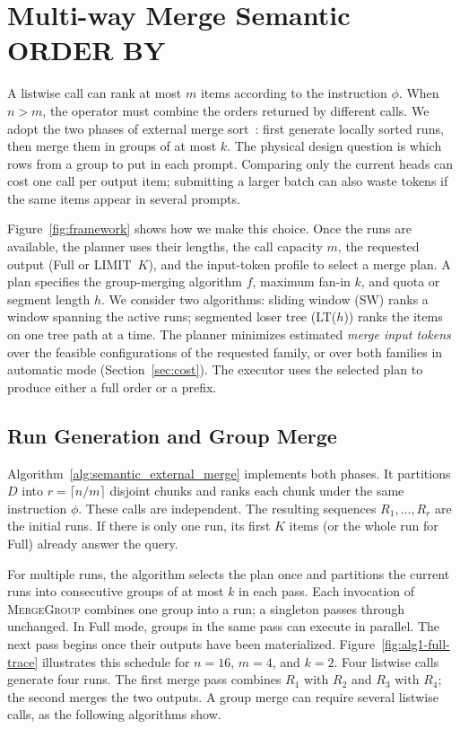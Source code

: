 \section{Multi-way Merge Semantic \textsf{ORDER BY}}
\label{sec:framework}

A listwise call can rank at most $m$ items according to the instruction $\phi$. When $n>m$, the operator must combine the orders returned by different calls. We adopt the two phases of external merge sort~\cite{DBLP:journals/csur/Graefe06}: first generate locally sorted runs, then merge them in groups of at most $k$. The physical design question is which rows from a group to put in each prompt. Comparing only the current heads can cost one call per output item; submitting a larger batch can also waste tokens if the same items appear in several prompts.

Figure~\ref{fig:framework} shows how we make this choice. Once the runs are available, the planner uses their lengths, the call capacity $m$, the requested output (Full or \textsf{LIMIT}~$K$), and the input-token profile to select a merge plan. A plan specifies the group-merging algorithm $f$, maximum fan-in $k$, and quota or segment length $h$. We consider two algorithms: sliding window (SW) ranks a window spanning the active runs; segmented loser tree (LT($h$)) ranks the items on one tree path at a time. The planner minimizes estimated \emph{merge input tokens} over the feasible configurations of the requested family, or over both families in automatic mode (Section~\ref{sec:cost}). The executor uses the selected plan to produce either a full order or a prefix.



\subsection{Run Generation and Group Merge}
\label{sec:external-merge}
Algorithm~\ref{alg:semantic_external_merge} implements both phases. It partitions $D$ into $r=\lceil n/m\rceil$ disjoint chunks and ranks each chunk under the same instruction $\phi$. These calls are independent. The resulting sequences $R_1,\ldots,R_r$ are the initial runs. If there is only one run, its first $K$ items (or the whole run for Full) already answer the query.




For multiple runs, the algorithm selects the plan once and partitions the current runs into consecutive groups of at most $k$ in each pass. Each invocation of \textsc{MergeGroup} combines one group into a run; a singleton passes through unchanged. In Full mode, groups in the same pass can execute in parallel. The next pass begins once their outputs have been materialized. Figure~\ref{fig:alg1-full-trace} illustrates this schedule for $n=16$, $m=4$, and $k=2$. Four listwise calls generate four runs. The first merge pass combines $R_1$ with $R_2$ and $R_3$ with $R_4$; the second merges the two outputs. A group merge can require several listwise calls, as the following algorithms show.

